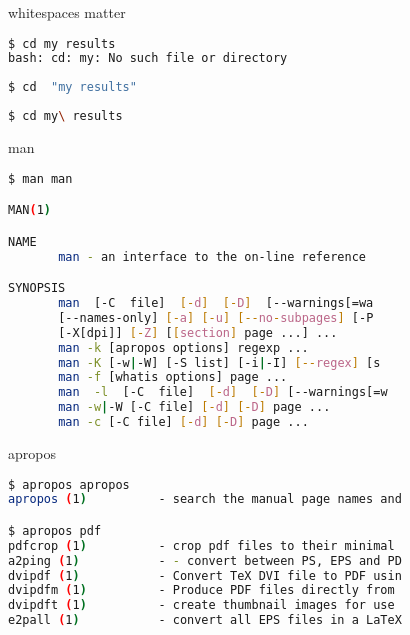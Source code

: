 \documentclass{beamer}
\begin{document}
\begin{frame}[fragile]
 \begin{center}
    \huge{whitespaces matter}\\
    \end{center}
\begin{lstlisting}[language=bash]
$ cd my results
bash: cd: my: No such file or directory
\end{lstlisting}


\begin{lstlisting}[language=bash]
$ cd  "my results"
\end{lstlisting}

\begin{lstlisting}[language=bash]
$ cd my\ results
\end{lstlisting}
  
\end{frame}





\begin{frame}[fragile]
 \begin{center}
    \huge{man}\\
    \end{center}
\begin{lstlisting}[language=bash]
$ man man

MAN(1)                                                               

NAME
       man - an interface to the on-line reference

SYNOPSIS
       man  [-C  file]  [-d]  [-D]  [--warnings[=wa
       [--names-only] [-a] [-u] [--no-subpages] [-P 
       [-X[dpi]] [-Z] [[section] page ...] ...
       man -k [apropos options] regexp ...
       man -K [-w|-W] [-S list] [-i|-I] [--regex] [s
       man -f [whatis options] page ...
       man  -l  [-C  file]  [-d]  [-D] [--warnings[=w
       man -w|-W [-C file] [-d] [-D] page ...
       man -c [-C file] [-d] [-D] page ...

\end{lstlisting}
\end{frame}


\begin{frame}[fragile]
 \begin{center}
    \huge{apropos}\\
    \end{center}
\begin{lstlisting}[language=bash]
$ apropos apropos
apropos (1)          - search the manual page names and 

$ apropos pdf
pdfcrop (1)          - crop pdf files to their minimal 
a2ping (1)           - - convert between PS, EPS and PD
dvipdf (1)           - Convert TeX DVI file to PDF usin
dvipdfm (1)          - Produce PDF files directly from
dvipdft (1)          - create thumbnail images for use 
e2pall (1)           - convert all EPS files in a LaTeX
\end{lstlisting}
\end{frame}
\end{document}
